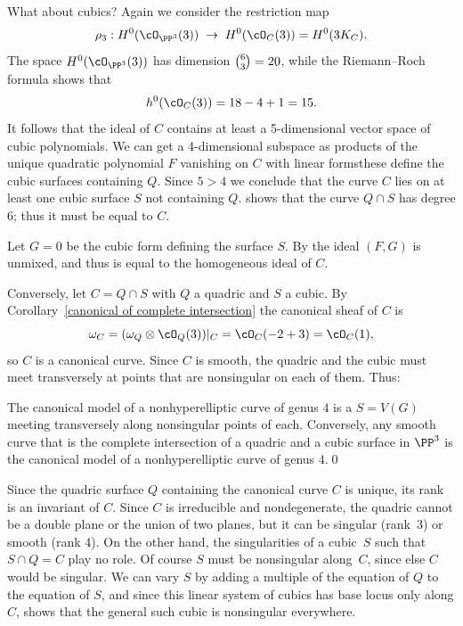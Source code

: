 What about cubics? Again we consider the restriction map
$$
\rho_3 : H^0(\cO_{\PP^3}(3)) \; \to \; H^0(\cO_{C}(3)) = H^0(3K_C).
$$
The space $H^0(\cO_{\PP^3}(3))$ has dimension $\tbinom{6}{3} = 20$, while  the Riemann--Roch formula shows that
$$
h^0(\cO_C(3)) = 18 - 4 + 1 = 15.
$$
It follows that the ideal of $C$ contains at least a 5-dimensional vector space of cubic polynomials. We can get a 4-dimensional subspace as products of the unique quadratic polynomial $F$ vanishing on $C$ with linear forms\emdash these define the cubic surfaces containing $Q$. Since $5 > 4$ we  conclude that the curve $C$ lies on at least one cubic surface $S$  not containing $Q$.
%
shows that the curve $Q \cap S$ has degree 6; thus it must be equal to $C$.

Let $G=0$ be the cubic form defining the surface $S$. By
%
the ideal $(F,G)$ is unmixed,
and thus is equal to the homogeneous ideal of $C$.

Conversely,
let $C = Q\cap S$ with $Q$ a quadric and $S$ a cubic. By Corollary~\ref{canonical of complete intersection} the canonical sheaf of $C$ is
$$
\omega_C = (\omega_{Q} \otimes \cO_{Q}(3))|_C = \cO_C(-2+3) = \cO_C(1)
,
$$
so $C$ is a canonical curve. Since $C$ is smooth, the quadric and the cubic must meet transversely at points that are nonsingular on each of them. Thus:

\begin{theorem}
\label{canonical genus 4}
The canonical model of a nonhyperelliptic curve of genus $4$ is a
%
%
$S=V(G)$ meeting transversely along nonsingular points of each.
Conversely, any smooth curve that is the complete intersection of a
quadric and a cubic surface in $\PP^3$ is the canonical model of a
nonhyperelliptic curve of genus $4$.\qed
\end{theorem}

Since the quadric surface $Q$ containing the canonical curve $C$
is unique, its rank is an invariant of $C$.
Since $C$ is irreducible and nondegenerate, the quadric cannot be a
double plane or the union of two planes, but it can be singular
(rank~3) or smooth (rank 4). On the other hand, the singularities of a
cubic~$S$ such that $S\cap Q = C$ play no role. Of course $S$ must be
nonsingular along~$C$, since else
$C$ would be singular. We can vary $S$ by adding a multiple of the
equation of $Q$ to the equation of $S$, and since this linear system
of cubics has base locus only along $C$,
%
shows that the general such cubic is nonsingular everywhere.

